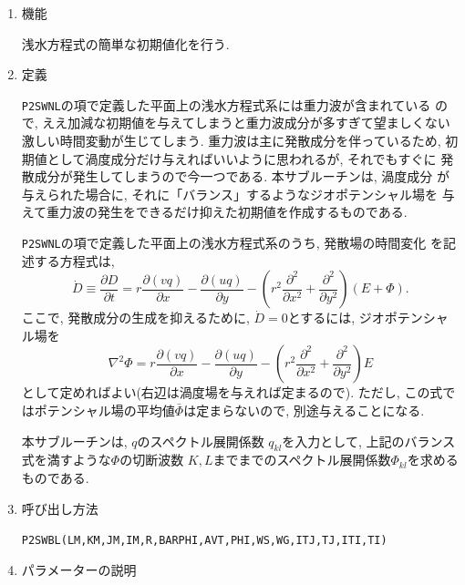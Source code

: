 \documentclass[a4j,fleqn]{jarticle}
\begin{document}
\begin{enumerate}

\item 機能 

浅水方程式の簡単な初期値化を行う.

\item 定義

{\tt P2SWNL}の項で定義した平面上の浅水方程式系には重力波が含まれている
ので, ええ加減な初期値を与えてしまうと重力波成分が多すぎて望ましくない
激しい時間変動が生じてしまう. 重力波は主に発散成分を伴っているため,
初期値として渦度成分だけ与えればいいように思われるが, それでもすぐに
発散成分が発生してしまうので今一つである. 本サブルーチンは, 渦度成分
が与えられた場合に, それに「バランス」するようなジオポテンシャル場を
与えて重力波の発生をできるだけ抑えた初期値を作成するものである.

{\tt P2SWNL}の項で定義した平面上の浅水方程式系のうち, 発散場の時間変化
を記述する方程式は,
\begin{equation}
\dot{D}\equiv\frac{\partial D}{\partial t}
=r\frac{\partial(vq)}{\partial x}
-\frac{\partial(uq)}{\partial y}
 -\left(r^2\frac{\partial^2}{\partial x^2}
  +\frac{\partial^2}{\partial y^2}\right)(E+\Phi).
\end{equation}
ここで, 発散成分の生成を抑えるために, $\dot D=0$とするには, 
ジオポテンシャル場を
\begin{equation}
\nabla^2\Phi
=r\frac{\partial(vq)}{\partial x}
-\frac{\partial(uq)}{\partial y}
 -\left(r^2\frac{\partial^2}{\partial x^2}
  +\frac{\partial^2}{\partial y^2}\right) E
\end{equation}
として定めればよい(右辺は渦度場を与えれば定まるので).
ただし, この式ではポテンシャル場の平均値$\bar\Phi$は定まらないので,
別途与えることになる.

本サブルーチンは, $q$のスペクトル展開係数
$q_{kl}$を入力として, 上記のバランス式を満すような$\Phi$の切断波数
$K,L$までまでのスペクトル展開係数$\Phi_{kl}$を求めるものである.

\item 呼び出し方法 

{\tt P2SWBL(LM,KM,JM,IM,R,BARPHI,AVT,PHI,WS,WG,ITJ,TJ,ITI,TI)}
  
\item パラメーターの説明


\end{enumerate}
\end{document}
